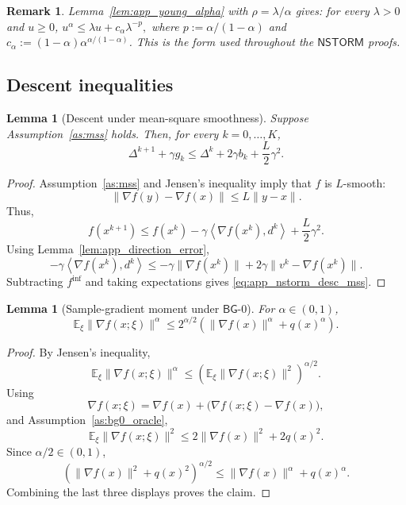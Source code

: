 \documentclass[letter,11pt]{article}
\newtheorem{remark}{\textbf{Remark}}
\newtheorem{lemma}[]{Lemma}
\newcommand{\E}{\mathbb{E}}
\begin{document}
\begin{remark}
\label{lem:app_nstorm_young}
Lemma~\ref{lem:app_young_alpha} with $\rho=\lambda/\alpha$ gives:
for every $\lambda>0$ and $u\ge0$,
$u^\alpha\le \lambda u+c_\alpha\lambda^{-p},$
where $p:=\alpha/(1-\alpha)$ and
$c_\alpha:=(1-\alpha)\alpha^{\alpha/(1-\alpha)}$.
This is the form used throughout the $\mathsf{NSTORM}$ proofs.
\end{remark}

\subsection{Descent inequalities}
\label{app:nstorm_descent}

\begin{lemma}[Descent under mean-square smoothness]
\label{lem:app_nstorm_desc_mss}
Suppose Assumption~\ref{as:mss} holds. Then, for every \(k=0,\ldots,K\),
\begin{equation}
\label{eq:app_nstorm_desc_mss}
    \Delta^{k+1}
    +
    \gamma g_k
    \le
    \Delta^k
    +
    2\gamma b_k
    +
    \frac{L}{2}\gamma^2.
\end{equation}
\end{lemma}

\begin{proof}
Assumption~\ref{as:mss} and Jensen's inequality imply that \(f\) is
\(L\)-smooth:
\[
    \|\nabla f(y)-\nabla f(x)\|
    \le
    L\|y-x\|.
\]
Thus,
\[
    f(x^{k+1})
    \le
    f(x^k)
    -
    \gamma\left\langle \nabla f(x^k),d^k\right\rangle
    +
    \frac{L}{2}\gamma^2.
\]
Using Lemma~\ref{lem:app_direction_error},
\[
    -\gamma\left\langle \nabla f(x^k),d^k\right\rangle
    \le
    -\gamma\|\nabla f(x^k)\|
    +
    2\gamma\|v^k-\nabla f(x^k)\|.
\]
Subtracting \(f^{\inf}\) and taking expectations gives
\eqref{eq:app_nstorm_desc_mss}.
\end{proof}

\begin{lemma}[Sample-gradient moment under \(\mathsf{BG}\)-0]
\label{lem:app_nstorm_alpha_moment}
For \(\alpha\in(0,1)\),
\[
    \E_\xi\|\nabla f(x;\xi)\|^\alpha
    \le
    2^{\alpha/2}
    \left(
        \|\nabla f(x)\|^\alpha+q(x)^\alpha
    \right).
\]
\end{lemma}

\begin{proof}
By Jensen's inequality,
\[
    \E_\xi\|\nabla f(x;\xi)\|^\alpha
    \le
    \left(\E_\xi\|\nabla f(x;\xi)\|^2\right)^{\alpha/2}.
\]
Using
\[
    \nabla f(x;\xi)
    =
    \nabla f(x)
    +
    \bigl(\nabla f(x;\xi)-\nabla f(x)\bigr),
\]
and Assumption~\ref{as:bg0_oracle},
\[
    \E_\xi\|\nabla f(x;\xi)\|^2
    \le
    2\|\nabla f(x)\|^2+2q(x)^2.
\]
Since \(\alpha/2\in(0,1)\),
\[
    \left(\|\nabla f(x)\|^2+q(x)^2\right)^{\alpha/2}
    \le
    \|\nabla f(x)\|^\alpha+q(x)^\alpha.
\]
Combining the last three displays proves the claim.
\end{proof}
\end{document}
